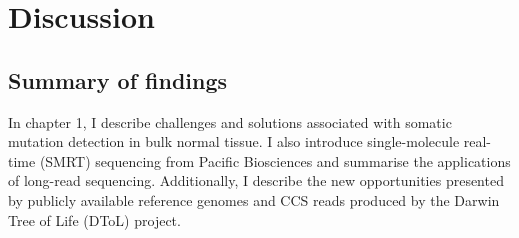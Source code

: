 \chapter{Discussion}

\ifpdf
    \graphicspath{{Chapter4/Figs/Raster/}{Chapter4/Figs/PDF/}{Chapter4/Figs/}}
\else
    \graphicspath{{Chapter4/Figs/Vector/}{Chapter4/Figs/}}
\fi

\section{Summary of findings}


In chapter 1, I describe challenges and solutions associated with somatic mutation detection in bulk normal tissue. I also introduce single-molecule real-time (SMRT) sequencing from Pacific Biosciences and summarise the applications of long-read sequencing. Additionally, I describe the new opportunities presented by publicly available reference genomes and CCS reads produced by the Darwin Tree of Life (DToL) project.  



